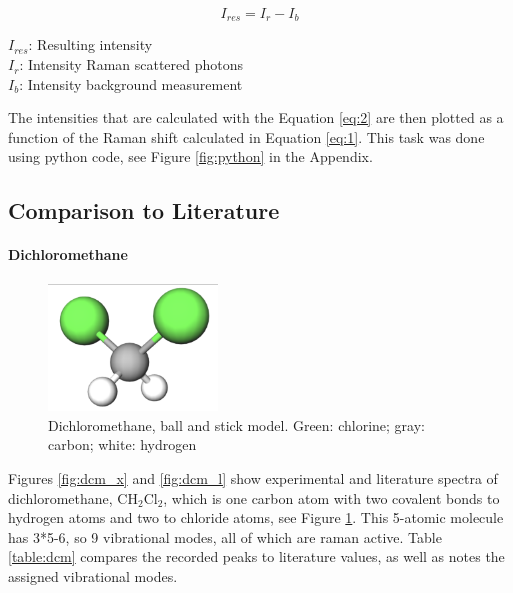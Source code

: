     \begin{equation} \label{eq:2}
        I_{res}=I_r-I_b
    \end{equation}

    \( I_{res}\): Resulting intensity\\
    \(I_r\): Intensity Raman scattered photons\\
    \(I_b\): Intensity background measurement

    \bigskip

    The intensities that are calculated with the Equation \ref{eq:2} are then plotted as a function of the Raman shift calculated in Equation \ref{eq:1}. This task was done using python code, see Figure \ref{fig:python} in the Appendix.

\subsection{Comparison to Literature}

\paragraph{Dichloromethane}

\begin{figure} %
    \centering
    \vspace{-20pt}
    \includegraphics[width=0.4\textwidth]{images/raman_spectra/dcm_i.png}
    \caption{Dichloromethane, ball and stick model. Green: chlorine; gray: carbon; white: hydrogen}
    \label{fig:dcm_i}
\end{figure}


    Figures \ref{fig:dcm_x} and \ref{fig:dcm_l} show experimental and literature spectra of dichloromethane, CH\(_2\)Cl\(_2\), which is one carbon atom with two covalent bonds to hydrogen atoms and two to chloride atoms, see Figure \ref{fig:dcm_i}. This 5-atomic molecule has 3*5-6, so 9 vibrational modes, all of which are raman active. Table \ref{table:dcm} compares the recorded peaks to literature values, as well as notes the assigned vibrational modes. 

